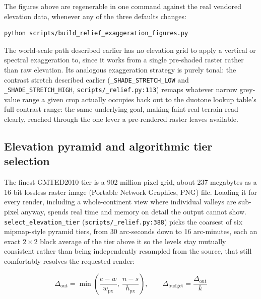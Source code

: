 \documentclass[11pt]{article}
\begin{document}
The figures above are regenerable in one command against the real
vendored elevation data, whenever any of the three defaults changes:

\begin{verbatim}
python scripts/build_relief_exaggeration_figures.py
\end{verbatim}

The world-scale path described earlier has no elevation grid to apply a
vertical or spectral exaggeration to, since it works from a single
pre-shaded raster rather than raw elevation. Its analogous exaggeration
strategy is purely tonal: the contrast stretch described earlier
(\texttt{\_SHADE\_STRETCH\_LOW} and \texttt{\_SHADE\_STRETCH\_HIGH},
\texttt{scripts/\_relief.py:113}) remaps whatever narrow grey-value
range a given crop actually occupies back out to the duotone lookup
table's full contrast range: the same underlying goal, making faint
real terrain read clearly, reached through the one lever a
pre-rendered raster leaves available.

\subsection{Elevation pyramid and algorithmic tier selection}
\label{sec:elevation-pyramid}

The finest GMTED2010 tier is a 902 million pixel grid, about 237
megabytes as a 16-bit lossless raster image (Portable Network Graphics,
PNG) file. Loading it for every render, including a whole-continent
view where individual valleys are sub-pixel anyway, spends real time and
memory on detail the output cannot show. \texttt{select\_elevation\_tier}
(\texttt{scripts/\_relief.py:388}) picks the coarsest of six mipmap-style
pyramid tiers, from 30 arc-seconds down to 16 arc-minutes, each an
exact $2\times2$ block average of the tier above it so the levels stay
mutually consistent rather than being independently resampled from the
source, that still comfortably resolves the requested render:

\[
\Delta_{\text{out}} = \min\!\left(\frac{e-w}{\,w_{\text{px}}\,},\ \frac{n-s}{\,h_{\text{px}}\,}\right), \qquad
\Delta_{\text{budget}} = \frac{\Delta_{\text{out}}}{k}
\]
\end{document}

